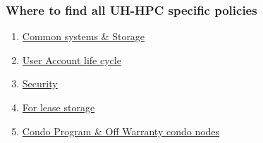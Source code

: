 \begin{frame}
\frametitle{Where to find all UH-HPC specific policies}
\begin{enumerate}
\item \href{http://go.hawaii.edu/GSY}{Common systems \& Storage}
\item \href{http://go.hawaii.edu/0SG}{User Account life cycle}
\item \href{http://go.hawaii.edu/WSG}{Security}
\item \href{http://go.hawaii.edu/YKG}{For lease storage}
\item \href{http://go.hawaii.edu/GK0}{Condo Program \& Off Warranty condo nodes}
\end{enumerate}
\end{frame}
%
